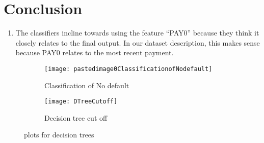 \documentclass{article}
\begin{document}
\section{Conclusion}
\begin{enumerate}

\item The classifiers incline towards using the feature “PAY0” because they think it closely relates to the final output. In our dataset description, this makes sense because PAY0 relates to the most recent payment.

\end{enumerate}
\begin{figure}[h]
\begin{subfigure}{.5\textwidth}
  \centering
 \texttt{[image: pastedimage0ClassificationofNodefault]}
  \caption{Classification of No default}
  \label{fig:sfig1}
\end{subfigure}%
\begin{subfigure}{.5\textwidth}
  \centering
  \texttt{[image: DTreeCutoff]}
  \caption{Decision tree cut off}
  \label{fig:sfig2}
\end{subfigure}
\caption{plots for decision trees }
\label{fig:fig}
\end{figure}
\end{document}

